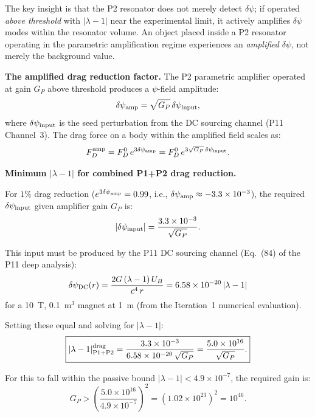 \documentclass[11pt,twocolumn]{article}
\newcommand{\dpsi}{\delta\psi}
\newcommand{\lam}{\lambda}
\begin{document}
The key insight is that the P2 resonator does not merely detect $\dpsi$; if
operated \emph{above threshold} with $|\lam-1|$ near the experimental limit,
it actively amplifies $\dpsi$ modes within the resonator volume. An object
placed inside a P2 resonator operating in the parametric amplification regime
experiences an \emph{amplified} $\dpsi$, not merely the background value.

\textbf{The amplified drag reduction factor.}
The P2 parametric amplifier operated at gain $G_P$ above threshold produces
a $\psi$-field amplitude:
\begin{equation}
\dpsi_{\rm amp} = \sqrt{G_P}\,\dpsi_{\rm input},
\label{eq:dpsi_amp}
\end{equation}
where $\dpsi_{\rm input}$ is the seed perturbation from the DC sourcing
channel (P11 Channel~3). The drag force on a body within the amplified
field scales as:
\begin{equation}
F_D^{\rm amp} = F_D^0\,e^{3\dpsi_{\rm amp}}
= F_D^0\,e^{3\sqrt{G_P}\,\dpsi_{\rm input}}.
\label{eq:fd_amp}
\end{equation}

\textbf{Minimum $|\lam-1|$ for combined P1+P2 drag reduction.}

For $1\%$ drag reduction ($e^{3\dpsi_{\rm amp}} = 0.99$, i.e.,
$\dpsi_{\rm amp} \approx -3.3\times10^{-3}$), the required
$\dpsi_{\rm input}$ given amplifier gain $G_P$ is:
\begin{equation}
|\dpsi_{\rm input}| = \frac{3.3\times10^{-3}}{\sqrt{G_P}}.
\label{eq:required_input}
\end{equation}

This input must be produced by the P11 DC sourcing channel
(Eq.~(84) of the P11 deep analysis):
\begin{equation}
\dpsi_{\rm DC}(r) = \frac{2G\,(\lam-1)\,U_B}{c^4\,r}
= 6.58\times10^{-20}\,|\lam-1|
\label{eq:dpsi_dc}
\end{equation}
for a 10~T, 0.1~m$^3$ magnet at 1~m (from the Iteration~1 numerical evaluation).

Setting these equal and solving for $|\lam-1|$:
\begin{equation}
\boxed{
|\lam-1|_{\rm P1+P2}^{\rm drag}
= \frac{3.3\times10^{-3}}{6.58\times10^{-20}\,\sqrt{G_P}}
= \frac{5.0\times10^{16}}{\sqrt{G_P}}.
}
\label{eq:lambda_combined}
\end{equation}

For this to fall within the passive bound $|\lam-1| < 4.9\times10^{-7}$,
the required gain is:
\begin{equation}
G_P > \left(\frac{5.0\times10^{16}}{4.9\times10^{-7}}\right)^2
= \left(1.02\times10^{23}\right)^2 = 10^{46}.
\label{eq:required_gain}
\end{equation}
\end{document}
